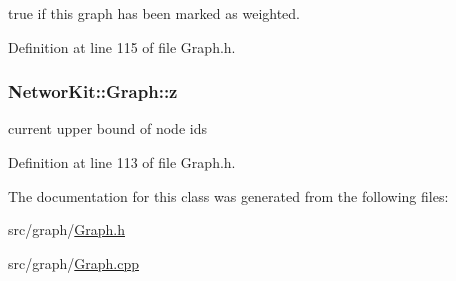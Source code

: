 true if this graph has been marked as weighted. 



Definition at line 115 of file Graph.\-h.

\hypertarget{class_networ_kit_1_1_graph_a4e544aace8b0d5bc5821c386e0500a46}{
\subsubsection[{z}]{ Networ\-Kit\-::\-Graph\-::z\hspace{0.3cm}{\ttfamily [protected]}}}\label{class_networ_kit_1_1_graph_a4e544aace8b0d5bc5821c386e0500a46}


current upper bound of node ids 



Definition at line 113 of file Graph.\-h.



The documentation for this class was generated from the following files\-:\begin{DoxyCompactItemize}
\item 
src/graph/\hyperlink{_graph_8h}{Graph.\-h}\item 
src/graph/\hyperlink{_graph_8cpp}{Graph.\-cpp}\end{DoxyCompactItemize}
